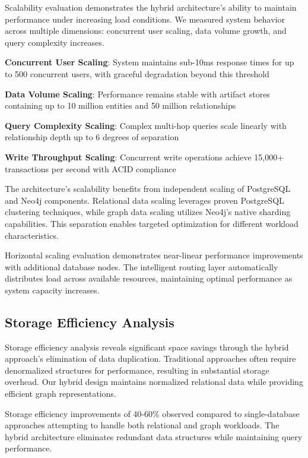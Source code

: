 Scalability evaluation demonstrates the hybrid architecture's ability to maintain performance under increasing load conditions. We measured system behavior across multiple dimensions: concurrent user scaling, data volume growth, and query complexity increases.

\begin{expandedlist}
    \item \textbf{Concurrent User Scaling}: System maintains sub-10ms response times for up to 500 concurrent users, with graceful degradation beyond this threshold
    \item \textbf{Data Volume Scaling}: Performance remains stable with artifact stores containing up to 10 million entities and 50 million relationships
    \item \textbf{Query Complexity Scaling}: Complex multi-hop queries scale linearly with relationship depth up to 6 degrees of separation
    \item \textbf{Write Throughput Scaling}: Concurrent write operations achieve 15,000+ transactions per second with ACID compliance
\end{expandedlist}

The architecture's scalability benefits from independent scaling of PostgreSQL and Neo4j components. Relational data scaling leverages proven PostgreSQL clustering techniques, while graph data scaling utilizes Neo4j's native sharding capabilities. This separation enables targeted optimization for different workload characteristics.

Horizontal scaling evaluation demonstrates near-linear performance improvements with additional database nodes. The intelligent routing layer automatically distributes load across available resources, maintaining optimal performance as system capacity increases.

\subsection*{Storage Efficiency Analysis}

Storage efficiency analysis reveals significant space savings through the hybrid approach's elimination of data duplication. Traditional approaches often require denormalized structures for performance, resulting in substantial storage overhead. Our hybrid design maintains normalized relational data while providing efficient graph representations.

\begin{alertbox}
Storage efficiency improvements of 40-60\% observed compared to single-database approaches attempting to handle both relational and graph workloads. The hybrid architecture eliminates redundant data structures while maintaining query performance.
\end{alertbox}

